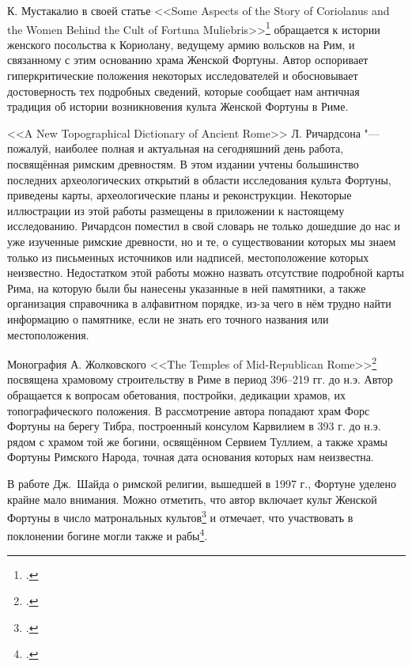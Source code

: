 
К. Мустакалио в своей статье <<Some Aspects of the Story of Coriolanus and the Women Behind the Cult of Fortuna Muliebris>>\footcite{Mustakallio1990} обращается к истории женского посольства к Кориолану, ведущему армию вольсков на Рим, и связанному с этим основанию храма Женской Фортуны. Автор оспоривает гиперкритические положения некоторых исследователей и обосновывает достоверность тех подробных сведений, которые сообщает нам античная традиция об истории возникновения культа Женской Фортуны в Риме.


<<A New Topographical Dictionary of Ancient Rome>> Л. Ричардсона "--- пожалуй, наиболее полная и актуальная на сегодняшний день работа, посвящённая римским древностям. В этом издании учтены большинство последних археологических открытий в области исследования культа Фортуны, приведены карты, археологические планы и реконструкции. Некоторые иллюстрации из этой работы размещены в приложении к настоящему исследованию. Ричардсон поместил в свой словарь не только дошедшие до нас и уже изученные римские древности, но и те, о существовании которых мы знаем только из письменных источников или надписей, местоположение которых неизвестно. Недостатком этой работы можно назвать отсутствие подробной карты Рима, на которую были бы нанесены указанные в ней памятники, а также организация справочника в алфавитном порядке, из-за чего в нём трудно найти информацию о памятнике, если не знать его точного названия или местоположения. 


Монография А. Жолковского <<The Temples of Mid-Republican Rome>>\footcite{Ziolkowski1992} посвящена храмовому строительству в Риме в период 396--219 гг. до н.э. Автор обращается к вопросам обетования, постройки, дедикации храмов, их топографического положения. В рассмотрение автора попадают храм Форс Фортуны на берегу Тибра, построенный консулом Карвилием в 393 г. до н.э. рядом с храмом той же богини, освящённом Сервием Туллием, а также храмы Фортуны Римского Народа, точная дата основания которых нам неизвестна.


В работе Дж.~Шайда о римской религии, вышедшей в 1997 г., Фортуне уделено крайне мало внимания. Можно отметить, что автор включает культ Женской Фортуны в число матрональных культов\footcite[С. 137]{Shayd2006} и отмечает, что участвовать в поклонении богине могли также и рабы\footcite[С. 160]{Shayd2006}.

